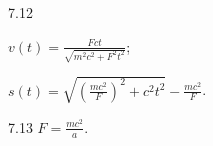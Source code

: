\begin{Solution}{7.{12}}
		\begin{enumerate*}[label=(\alph*)]
			\item $v(t) = \frac{Fct}{\sqrt{m^2c^2 + F^2t^2}}$;
			\item $s(t) = \sqrt{\left( \frac{mc^2}{F}\right)^2 + c^2t^2  } - \frac{mc^2}{F}$.
		\end{enumerate*}
	
\end{Solution}
\begin{Solution}{7.{13}}
		$F = \frac{mc^2}{a}$.
	
\end{Solution}
